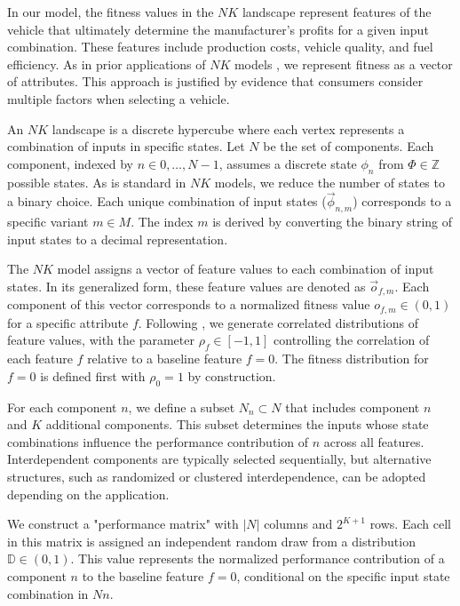 \documentclass[12pt]{article}
\begin{document}
	In our model, the fitness values in the $NK$ landscape represent features of the vehicle that ultimately determine the manufacturer’s profits for a given input combination. These features include production costs, vehicle quality, and fuel efficiency. As in prior applications of $NK$ models \citep{adner2014positioning, csaszar2016mental}, we represent fitness as a vector of attributes. This approach is justified by evidence \citep{horne2005improving, ostli2017generic} that consumers consider multiple factors when selecting a vehicle.
	
	An $NK$ landscape is a discrete hypercube where each vertex represents a combination of inputs in specific states. Let $N$ be the set of components. Each component, indexed by $n \in {0, \ldots, N-1}$, assumes a discrete state $\phi_n$ from $\Phi \in \mathbb{Z}$ possible states. As is standard in $NK$ models, we reduce the number of states to a binary choice. Each unique combination of input states ($\Vec{\phi}_{n,m}$) corresponds to a specific variant $m \in M$. The index $m$ is derived by converting the binary string of input states to a decimal representation. 
	
	The $NK$ model assigns a vector of feature values to each combination of input states. In its generalized form, these feature values are denoted as $\vec{o}_{f,m}$. Each component of this vector corresponds to a normalized fitness value $o_{f,m} \in (0, 1)$ for a specific attribute $f$. Following \citep{adner2014positioning}, we generate correlated distributions of feature values, with the parameter $\rho_{f} \in [-1, 1]$ controlling the correlation of each feature $f$ relative to a baseline feature $f=0$. The fitness distribution for $f=0$ is defined first with $\rho_{0} = 1$ by construction.
	
	For each component $n$, we define a subset $N_{n} \subset N$ that includes component $n$ and $K$ additional components. This subset determines the inputs whose state combinations influence the performance contribution of $n$ across all features. Interdependent components are typically selected sequentially, but alternative structures, such as randomized or clustered interdependence, can be adopted depending on the application. 
	
	We construct a "performance matrix" with $|N|$ columns and $2^{K+1}$ rows. Each cell in this matrix is assigned an independent random draw from a distribution $\mathbb{D} \in (0, 1)$. This value represents the normalized performance contribution of a component $n$ to the baseline feature $f=0$, conditional on the specific input state combination in $N{n}$.
	
\end{document}
